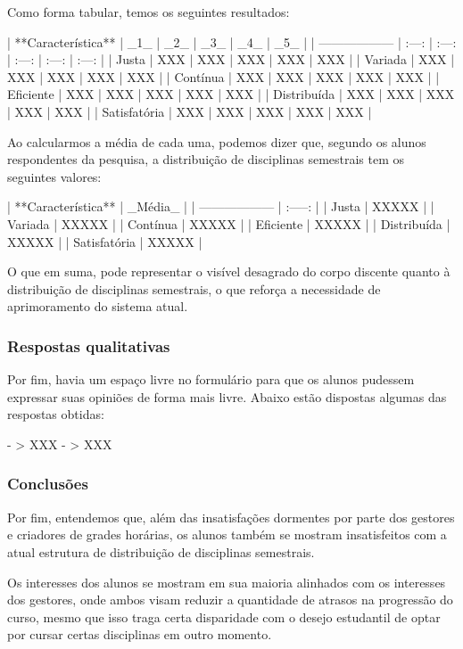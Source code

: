         Como forma tabular, temos os seguintes resultados:

        | **Característica** |  _1_  |  _2_  |  _3_  |  _4_  |  _5_  |
        | ------------------ | :---: | :---: | :---: | :---: | :---: |
        | Justa              |  XXX  |  XXX  |  XXX  |  XXX  |  XXX  |
        | Variada            |  XXX  |  XXX  |  XXX  |  XXX  |  XXX  |
        | Contínua           |  XXX  |  XXX  |  XXX  |  XXX  |  XXX  |
        | Eficiente          |  XXX  |  XXX  |  XXX  |  XXX  |  XXX  |
        | Distribuída        |  XXX  |  XXX  |  XXX  |  XXX  |  XXX  |
        | Satisfatória       |  XXX  |  XXX  |  XXX  |  XXX  |  XXX  |

        Ao calcularmos a média de cada uma, podemos dizer que, segundo os alunos respondentes da pesquisa, a distribuição de disciplinas semestrais tem os seguintes valores:

        | **Característica** | _Média_ |
        | ------------------ | :-----: |
        | Justa              |  XXXXX  |
        | Variada            |  XXXXX  |
        | Contínua           |  XXXXX  |
        | Eficiente          |  XXXXX  |
        | Distribuída        |  XXXXX  |
        | Satisfatória       |  XXXXX  |

        O que em suma, pode representar o visível desagrado do corpo discente quanto à distribuição de disciplinas semestrais, o que reforça a necessidade de aprimoramento do sistema atual.

        \subsubsection{Respostas qualitativas} %

            Por fim, havia um espaço livre no formulário para que os alunos pudessem expressar suas opiniões de forma mais livre. Abaixo estão dispostas algumas das respostas obtidas:

            - > XXX
            - > XXX

    \subsubsection{Conclusões} %

        Por fim, entendemos que, além das insatisfações dormentes por parte dos gestores e criadores de grades horárias, os alunos também se mostram insatisfeitos com a atual estrutura de distribuição de disciplinas semestrais.

        Os interesses dos alunos se mostram em sua maioria alinhados com os interesses dos gestores, onde ambos visam reduzir a quantidade de atrasos na progressão do curso, mesmo que isso traga certa disparidade com o desejo estudantil de optar por cursar certas disciplinas em outro momento.
